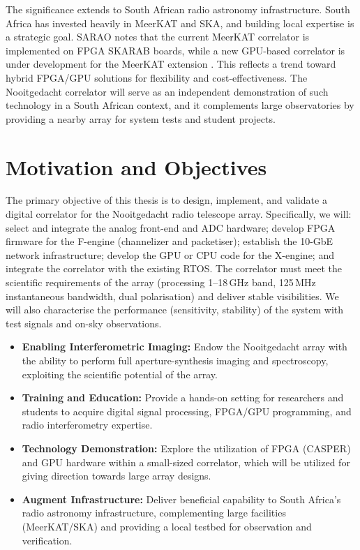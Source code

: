    The significance extends to South African radio astronomy infrastructure. South Africa has invested heavily in MeerKAT and SKA, and building local expertise is a strategic goal. SARAO notes that the current MeerKAT correlator is implemented on FPGA SKARAB boards, while a new GPU-based correlator is under development for the MeerKAT extension \cite{SARAO2024}. This reflects a trend toward hybrid FPGA/GPU solutions for flexibility and cost-effectiveness. The Nooitgedacht correlator will serve as an independent demonstration of such technology in a South African context, and it complements large observatories by providing a nearby array for system tests and student projects.
    
    \section{Motivation and Objectives}
    The primary objective of this thesis is to design, implement, and validate a digital correlator for the Nooitgedacht radio telescope array. Specifically, we will: select and integrate the analog front-end and ADC hardware; develop FPGA firmware for the F-engine (channelizer and packetiser); establish the 10-GbE network infrastructure; develop the GPU or CPU code for the X-engine; and integrate the correlator with the existing RTOS. The correlator must meet the scientific requirements of the array (processing 1–18\,GHz band, 125\,MHz instantaneous bandwidth, dual polarisation) and deliver stable visibilities. We will also characterise the performance (sensitivity, stability) of the system with test signals and on-sky observations.
    
    \begin{itemize}
        \item \textbf{Enabling Interferometric Imaging:} Endow the Nooitgedacht array with the ability to perform full aperture-synthesis imaging and spectroscopy, exploiting the scientific potential of the array.

        \item \textbf{Training and Education:} Provide a hands-on setting for researchers and students to acquire digital signal processing, FPGA/GPU programming, and radio interferometry expertise.
    
        \item \textbf{Technology Demonstration:} Explore the utilization of FPGA (CASPER) and GPU hardware within a small-sized correlator, which will be utilized for giving direction towards large array designs.

        \item \textbf{Augment Infrastructure:} Deliver beneficial capability to South Africa's radio astronomy infrastructure, complementing large facilities (MeerKAT/SKA) and providing a local testbed for observation and verification.
    \end{itemize}
    
